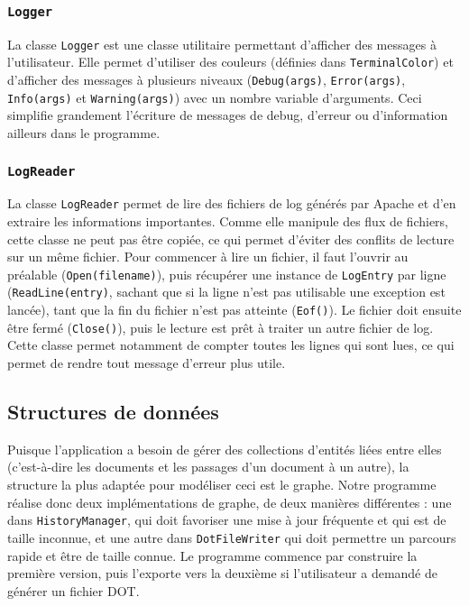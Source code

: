 \documentclass[11pt,a4paper]{article}
\begin{document}
\subsubsection{\texttt{Logger}}

La classe \texttt{Logger} est une classe utilitaire permettant d'afficher des messages à l'utilisateur. Elle permet d'utiliser des couleurs (définies dans \texttt{TerminalColor}) et d'afficher des messages à plusieurs niveaux (\texttt{Debug(args)}, \texttt{Error(args)}, \texttt{Info(args)} et \texttt{Warning(args)}) avec un nombre variable d'arguments. Ceci simplifie grandement l'écriture de messages de debug, d'erreur ou d'information ailleurs dans le programme.

\subsubsection{\texttt{LogReader}}

La classe \texttt{LogReader} permet de lire des fichiers de log générés par Apache et d'en extraire les informations importantes. Comme elle manipule des flux de fichiers, cette classe ne peut pas être copiée, ce qui permet d'éviter des conflits de lecture sur un même fichier. Pour commencer à lire un fichier, il faut l'ouvrir au préalable (\texttt{Open(filename)}), puis récupérer une instance de \texttt{LogEntry} par ligne (\texttt{ReadLine(entry)}, sachant que si la ligne n'est pas utilisable une exception est lancée), tant que la fin du fichier n'est pas atteinte (\texttt{Eof()}). Le fichier doit ensuite être fermé (\texttt{Close()}), puis le lecture est prêt à traiter un autre fichier de log. Cette classe permet notamment de compter toutes les lignes qui sont lues, ce qui permet de rendre tout message d'erreur plus utile.

\subsection{Structures de données}

Puisque l'application a besoin de gérer des collections d'entités liées entre elles (c'est-à-dire les documents et les passages d'un document à un autre), la structure la plus adaptée pour modéliser ceci est le graphe. Notre programme réalise donc deux implémentations de graphe, de deux manières différentes : une dans \texttt{HistoryManager}, qui doit favoriser une mise à jour fréquente et qui est de taille inconnue, et une autre dans \texttt{DotFileWriter} qui doit permettre un parcours rapide et être de taille connue. Le programme commence par construire la première version, puis l'exporte vers la deuxième si l'utilisateur a demandé de générer un fichier DOT.
\end{document}
